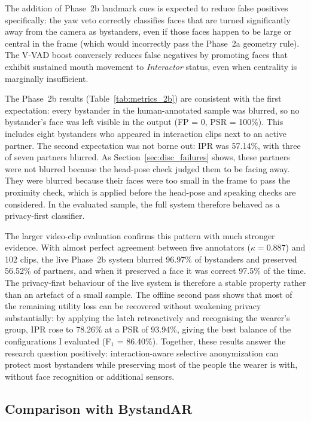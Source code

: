 The addition of Phase~2b landmark cues is expected to reduce false positives
specifically: the yaw veto correctly classifies faces that are turned significantly
away from the camera as bystanders, even if those faces happen to be large or
central in the frame (which would incorrectly pass the Phase~2a geometry rule). The
V-VAD boost conversely reduces false negatives by promoting faces that exhibit
sustained mouth movement to \emph{Interactor} status, even when centrality is
marginally insufficient.

The Phase~2b results (Table~\ref{tab:metrics_2b}) are consistent with the first
expectation: every bystander in the human-annotated sample was blurred, so no
bystander's face was left visible in the output (FP = 0, PSR = 100\%). This includes
eight bystanders who appeared in interaction clips next to an active partner. The
second expectation was not borne out: IPR was 57.14\%, with three of seven partners
blurred. As Section~\ref{sec:disc_failures} shows, these partners were not blurred
because the head-pose check judged them to be facing away. They were blurred because
their faces were too small in the frame to pass the proximity check, which is applied
before the head-pose and speaking checks are considered. In the
evaluated sample, the full system therefore behaved as a privacy-first classifier.

The larger video-clip evaluation confirms this pattern with much stronger evidence.
With almost perfect agreement between five annotators ($\kappa = 0.887$) and 102 clips,
the live Phase~2b system blurred 96.97\% of bystanders and preserved 56.52\% of
partners, and when it preserved a face it was correct 97.5\% of the time. The
privacy-first behaviour of the live system is therefore a stable property rather
than an artefact of a small sample. The offline second pass shows that most of the
remaining utility loss can be recovered without weakening privacy substantially:
by applying the latch retroactively and recognising the wearer's group, IPR rose to
78.26\% at a PSR of 93.94\%, giving the best balance of the configurations I
evaluated (F$_1$ = 86.40\%). Together, these results answer the research question
positively: interaction-aware selective anonymization can protect most bystanders
while preserving most of the people the wearer is with, without face recognition or
additional sensors.

\subsection{Comparison with BystandAR}
\label{sec:disc_bystandar}


